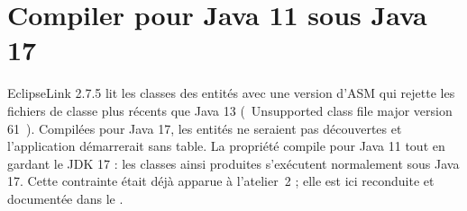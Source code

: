 
\section{Compiler pour Java 11 sous Java 17}\label{sec:asm}
EclipseLink 2.7.5 lit les classes des entités avec une version d'ASM qui rejette les fichiers de classe plus récents
que Java 13 (\guillemotleft~Unsupported class file major version 61~\guillemotright{}). Compilées pour Java 17, les entités ne seraient
pas découvertes et l'application démarrerait sans table. La propriété  compile
pour Java 11 tout en gardant le JDK 17 : les classes ainsi produites s'exécutent normalement sous Java 17. Cette
contrainte était déjà apparue à l'atelier~2 ; elle est ici reconduite et documentée dans le .
